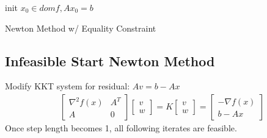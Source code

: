 \documentclass[8pt]{report}
\begin{document}
\begin{multicols*}{2}
  \vfill\null
  \columnbreak
  
  \begin{algorithm}[H]
    init $x_0 \in dom f, Ax_0=b$\;
    \caption{Newton Method w/ Equality Constraint\label{NewtonMethodEq}}
  \end{algorithm}

  \subsection{Infeasible Start Newton Method}
  Modify KKT system for residual: $Av=b-Ax$
  \begin{align*}
    &\begin{bmatrix}
      \nabla^2 f(x) & A^T \\
      A & 0 
    \end{bmatrix}
          \begin{bmatrix}
            v\\ w
          \end{bmatrix}=
    K
    \begin{bmatrix}
      v\\ w
    \end{bmatrix} =
    \begin{bmatrix}
      -\nabla f(x)\\
      b-Ax
    \end{bmatrix}
  \end{align*}
  Once step length becomes 1, all following iterates are feasible.\\


\end{multicols*}
\end{document}
